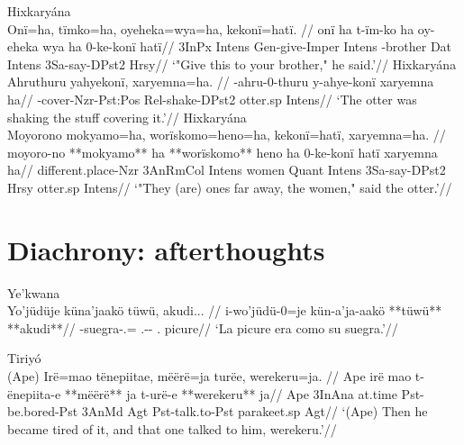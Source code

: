 \documentclass[10pt]{article}
\begin{document}
\pex\label{}    \a Hixkaryána\\
    \label{derbyshire-1965-p-040-the-buzzard-people-and-their-servant-the-sloth-109}        \begingl
        \glpreamble Onï=ha, tïmko=ha, oyeheka=wya=ha, kekonï=hatï. //
        \gla onï ha t-ïm-ko ha oy-eheka wya ha 0-ke-konï hatï//
        \glb 3InPx Intens Gen-give-Imper Intens -brother Dat Intens 3Sa-say-DPst2 Hrsy//
            \glft ‘"Give this to your brother," he said.’//  
        \endgl 
    \a Hixkaryána\\
    \label{derbyshire-1965-p-061-the-wives-of-mawarye-and-woxka-040}        \begingl
        \glpreamble Ahruthuru yahyekonï, xaryemna=ha. //
        -ahru-0-thuru y-ahye-konï xaryemna ha//
        \glb {}-cover-Nzr-Pst:Pos Rel-shake-DPst2 otter.sp Intens//
            \glft ‘The otter was shaking the stuff covering it.’//  
        \endgl 
    \a Hixkaryána\\
    \label{derbyshire-1965-p-062-the-wives-of-mawarye-and-woxka-071}        \begingl
        \glpreamble Moyorono mokyamo=ha, worïskomo=heno=ha, kekonï=hatï, xaryemna=ha. //
        \gla moyoro-no **mokyamo** ha **worïskomo** heno ha 0-ke-konï hatï xaryemna ha//
        \glb different.place-Nzr 3AnRmCol Intens women Quant Intens 3Sa-say-DPst2 Hrsy otter.sp Intens//
            \glft ‘"They (are) ones far away, the women," said the otter.’//  
        \endgl 
\xe

\section{Diachrony: afterthoughts}

\ex Ye'kwana \parencite{caceresDByekwana} \\
\label{ctoabjpic-003}    \begingl
    \glpreamble Yo'jüdüje küna'jaakö tüwü, akudi... //
    \gla i-wo'jüdü-0=je kün-a'ja-aakö **tüwü** **akudi**//
    \glb {}-suegra-.= .-- . picure//
        \glft ‘La picure era como su suegra.’//  
    \endgl 
\xe

\ex Tiriyó \parencite{meiraDBtrio} \\
\label{dados-09-kereramake-p-047-374}    \begingl
    \glpreamble (Ape) Irë=mao tënepiitae, mëërë=ja turëe, werekeru=ja. //
    \gla Ape irë mao t-ënepiita-e **mëërë** ja t-urë-e **werekeru** ja//
    \glb Ape 3InAna at.time Pst-be.bored-Pst 3AnMd Agt Pst-talk.to-Pst parakeet.sp Agt//
        \glft ‘(Ape) Then he became tired of it, and that one talked to him, werekeru.’//  
    \endgl 
\xe
\end{document}
